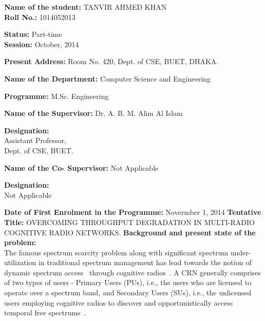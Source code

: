 \documentclass[12pt,addpoints,fleqn]{exam}
\begin{document}
\begin{questions}
{\bfseries \question}
\begin{minipage}[t]{0.7\textwidth}
\flushleft
\textbf{Name of the student:} TANVIR AHMED KHAN\\
\textbf{Roll No.:} 1014052013
\end{minipage}
\begin{minipage}[t]{0.3\textwidth}
\flushleft
\textbf{Status:} Part-time\\
\textbf{Session:} October, 2014
\end{minipage}
{\bfseries \question
\textbf{Present Address:}} Room No. 420, Dept. of CSE, BUET, DHAKA.
{\bfseries \question}
\begin{minipage}[t]{0.7\textwidth}
\flushleft
\textbf{Name of the Department:} Computer Science and Engineering
\end{minipage}
\begin{minipage}[t]{0.3\textwidth}
\flushleft
\textbf{Programme:} M.Sc. Engineering
\end{minipage}
{\bfseries \question}
\begin{minipage}[t]{0.7\textwidth}
\flushleft
\textbf{Name of the Supervisor:} Dr. A. B. M. Alim Al Islam
\end{minipage}
\begin{minipage}[t]{0.3\textwidth}
\flushleft
\textbf{Designation:}\\Assistant Professor, \\Dept. of CSE, BUET.
\end{minipage}
{\bfseries \question}
\begin{minipage}[t]{0.7\textwidth}
\flushleft
\textbf{Name of the Co- Supervisor:} Not Applicable
\end{minipage}
\begin{minipage}[t]{0.3\textwidth}
\flushleft
\textbf{Designation:}\\Not Applicable
\end{minipage}
{\bfseries \question
\textbf{Date of First Enrolment in the Programme:}} Novermber 1, 2014
{\bfseries \question
\textbf{Tentative Title:}} \MakeUppercase{Overcoming Throughput Degradation in Multi-Radio Cognitive Radio Networks.}
{\bfseries \question
\textbf{Background and present state of the problem:}}\\
The famous spectrum scarcity problem along with significant spectrum under-utilization in traditional spectrum management has lead towards the notion of dynamic spectrum access~\cite{akyildiz2006next} through cognitive radios~\cite{Mitola}. A CRN generally comprises of two types of users - Primary Users (PUs), i.e., the users who are licensed to operate over a spectrum band, and Secondary Users (SUs), i.e., the unlicensed users employing cognitive radios to discover and opportunistically access temporal free spectrums~\cite{pelechrinis2013cognitive, zhang2016cognitive}.


\end{questions}
\end{document}
